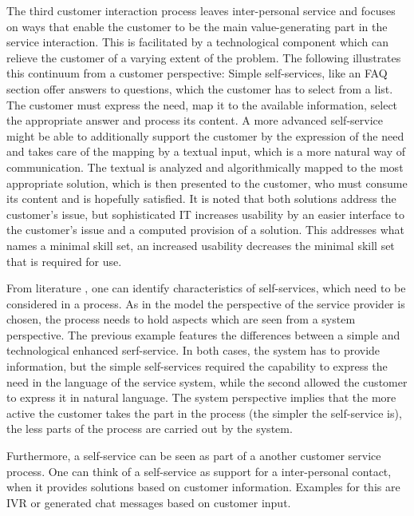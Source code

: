 	The third customer interaction process leaves inter-personal service \citep{Thomas2008self} and focuses on ways that enable the customer to be the main value-generating part in the service interaction. This is facilitated by a technological component which can relieve the customer of a varying extent of the problem. The following illustrates this continuum from a customer perspective: Simple self-services, like an \acrshort{FAQ} section offer answers to questions, which the customer has to select from a list. The customer must express the need, map it to the available information, select the appropriate answer and process its content. A more advanced self-service might be able to additionally support the customer by the expression of the need and takes care of the mapping by a textual input, which is a more natural way of communication. The textual is analyzed and algorithmically mapped to the most appropriate solution, which is then presented to the customer, who must consume its content and is hopefully satisfied. It is noted that both solutions address the customer's issue, but sophisticated \acrshort{IT} increases usability by an easier interface to the customer's issue and a computed provision of a solution. This addresses what \citep{Thomas2008self} names a minimal skill set, \viz an increased usability decreases the minimal skill set that is required for use. 
	
	From literature \citep{meuter2000self, Thomas2008self, Thomas:2009}, one can identify characteristics of self-services, which need to be considered in a process. As in the model the perspective of the service provider is chosen, the process needs to hold aspects which are seen from a system perspective. The previous example features the differences between a simple and technological enhanced serf-service. In both cases, the system has to provide information, but the simple self-services required the capability to express the need in the language of the service system, while the second allowed the customer to express it in natural language. The system perspective implies that the more active the customer takes the part in the process (\ie the simpler the self-service is), the less parts of the process are carried out by the system. 
	
	Furthermore, a self-service can be seen as part of a another customer service process. One can think of a self-service as support for a inter-personal contact, when it provides solutions based on customer information. Examples for this are \acrshort{IVR} or generated chat messages based on customer input.
	
